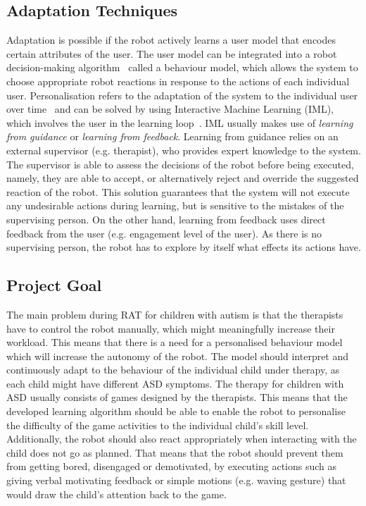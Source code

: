 \documentclass[thesis]{mas_proposal}
\begin{document}
\subsection{Adaptation Techniques}
Adaptation is possible if the robot actively learns a user model that encodes certain attributes of the user. The user model can be integrated into a robot decision-making algorithm~\cite{rossi2017user} called a behaviour model, which allows the system to choose appropriate robot reactions in response to the actions of each individual user. Personalisation refers to the adaptation of the system to the individual user over time~\cite{rossi2017user} and can be solved by using Interactive Machine Learning (IML), which involves the user in the learning loop~\cite{senft2019teaching}. IML usually makes use of \emph{learning from guidance} or \emph{learning from feedback}. Learning from guidance relies on an external supervisor (e.g. therapist), who provides expert knowledge to the system. The supervisor is able to assess the decisions of the robot before being executed, namely, they are able to accept, or alternatively reject and override the suggested reaction of the robot. This solution guarantees that the system will not execute any undesirable actions during learning, but is sensitive to the mistakes of the supervising person. On the other hand, learning from feedback uses direct feedback from the user (e.g. engagement level of the user). As there is no supervising person, the robot has to explore by itself what effects its actions have. 

\subsection{Project Goal}
The main problem during RAT for children with autism is that the therapists have to control the robot manually, which might meaningfully increase their workload. This means that there is a need for a personalised behaviour model which will increase the autonomy of the robot. The model should interpret and continuously adapt to the behaviour of the individual child under therapy, as each child might have different ASD symptoms. The therapy for children with ASD usually consists of games designed by the therapists. This means that the developed learning algorithm should be able to enable the robot to personalise the difficulty of the game activities to the individual child's skill level. Additionally, the robot should also react appropriately when interacting with the child does not go as planned. That means that the robot should prevent them from getting bored, disengaged or demotivated, by executing actions such as giving verbal motivating feedback or simple motions (e.g. waving gesture) that would draw the child’s attention back to the game.
\end{document}
